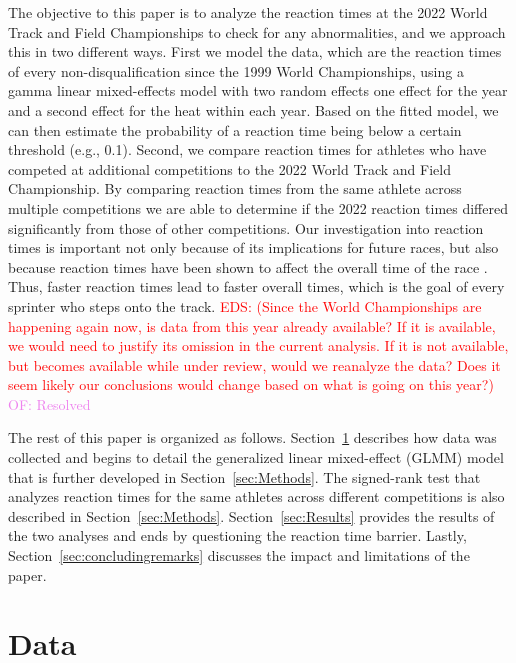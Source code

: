 \documentclass[12pt, letterpaper, titlepage]{article}
\newcommand{\eds}[1]{\textcolor{red}{EDS: (#1)}}
\newcommand{\of}[1]{\textcolor{violet}{OF: #1}}
\begin{document}
The objective to this paper is to analyze the reaction times at the 2022 World 
Track and Field Championships to check for any abnormalities, and we approach
this in two different ways.  First we model the data, which are
the reaction times of every non-disqualification since the 1999 World 
Championships, using a gamma linear mixed-effects model with two random effects 
one effect for the year and a second effect for the
heat within each year.
Based on the fitted model, we can then estimate the probability of a reaction 
time being below a certain threshold (e.g., 0.1). 
Second, we compare reaction times for athletes who have competed
at additional competitions to the 2022 World Track and Field Championship.  By
comparing reaction times from the same athlete across multiple competitions we 
are able to determine if the 2022 reaction times differed significantly from 
those of other competitions.
Our investigation into reaction times is important not only because of its
implications for future races, but also because reaction times have
been shown to affect the overall time of the race \citep{delalija2008reaction}.
Thus, faster reaction times lead to faster overall times, which is the goal of
every sprinter who steps onto the track.
\eds{Since the World Championships are happening again now, is data from this 
year already available? If it is available, we would need to justify its omission
in the current analysis.
If it is not available, but becomes available while under review, would we 
reanalyze the data?  Does it seem likely our conclusions would change based on
what is going on this year?}
\of{Resolved}


The rest of this paper is organized as follows. Section~\ref{sec:Data} describes 
how data was collected and begins to detail the generalized linear mixed-effect 
(GLMM) model that is further developed in Section~\ref{sec:Methods}. The 
signed-rank test that analyzes reaction times for the same athletes across
different competitions is
also described in Section~\ref{sec:Methods}.  Section~\ref{sec:Results}
 provides the results of the two analyses and ends 
by questioning the reaction time barrier.  Lastly, Section~\ref{sec:concludingremarks}
discusses the impact and limitations of the paper.


\section{Data} \label{sec:Data}
\end{document}
